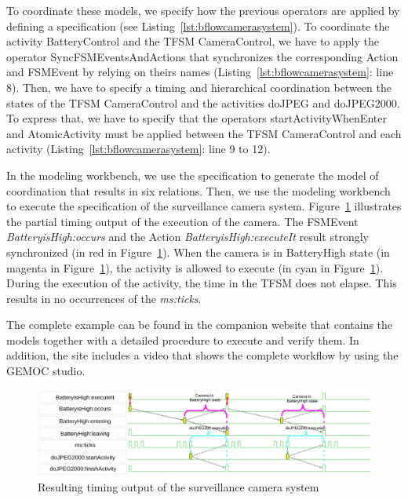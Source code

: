 To coordinate these models, we specify how the previous operators are applied by defining a \bflow specification (see Listing~\ref{lst:bflowcamerasystem}). To coordinate the activity BatteryControl and the TFSM CameraControl, we have to apply the operator SyncFSMEventsAndActions that synchronizes the corresponding Action and FSMEvent by relying on theirs names (Listing~\ref{lst:bflowcamerasystem}: line 8). Then, we have to specify a timing and hierarchical coordination between the states of the TFSM CameraControl and the activities doJPEG and doJPEG2000. To express that, we have to specify that the operators startActivityWhenEnter and AtomicActivity must be applied between the TFSM CameraControl and each activity (Listing~\ref{lst:bflowcamerasystem}: line 9 to 12).

In the modeling workbench, we use the \bflow specification to generate the model of coordination that results in six \ccsl relations. Then, we use the modeling workbench to execute the \ccsl specification of the surveillance camera system. Figure~\ref{fig:camerasystem} illustrates the partial timing output of the execution of the camera. The \mse FSMEvent \emph{BatteryisHigh:occurs} and the Action \emph{BatteryisHigh:executeIt} result strongly synchronized (in red in Figure~\ref{fig:camerasystem}). When the camera is in BatteryHigh state (in magenta in Figure~\ref{fig:camerasystem}), the activity is allowed to execute (in cyan in Figure~\ref{fig:camerasystem}). During the execution of the activity, the time in the TFSM does not elapse. This results in no occurrences of the \mse \emph{ms:ticks}.
	
The complete example can be found in the companion website that contains the models together with a detailed procedure to execute and verify them. In addition, the site includes a video that shows the complete workflow by using the GEMOC studio. 
	 
	 
	 
	
	
	



	
	
		\begin{figure}
			\center
			\includegraphics[width=1\columnwidth]{examples/figs/vcdcamera}
			\caption{Resulting timing output of the surveillance camera system}
			\label{fig:camerasystem}
		\end{figure}
	
